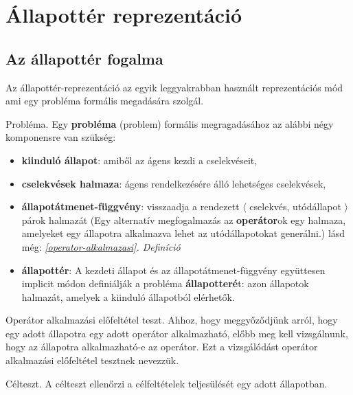 \section{Állapottér reprezentáció}

\subsection{Az állapottér fogalma}

Az állapottér-reprezentáció az egyik leggyakrabban használt reprezentációs mód
ami egy probléma formális megadására szolgál.

\begin{definicio}
    Probléma.
    Egy \textbf{probléma} (problem) formális megragadásához az alábbi négy
    komponensre van szükség:

    \begin{itemize}
        \item \textbf{kiinduló állapot}:
            amiből az ágens kezdi a cselekvéseit,
        \item \textbf{cselekvések halmaza}:
            ágens rendelkezésére álló lehetséges cselekvések,
        \item \textbf{állapotátmenet-függvény}:
            visszaadja a rendezett $\langle$ cselekvés, utódállapot $\rangle$
            párok halmazát (Egy alternatív megfogalmazás az \textbf{operátor}ok
            egy halmaza, amelyeket egy állapotra alkalmazva lehet az
            utódállapotokat generálni.) lásd még:
            \textit{\ref{operator-alkalmazasi}. Definíció}
        \item \textbf{állapottér}: A kezdeti állapot és az
            állapotátmenet-függvény együttesen implicit módon definiálják a
            probléma \textbf{állapotteré}t: azon állapotok halmazát, amelyek a
            kiinduló állapotból elérhetők.
    \end{itemize}
\end{definicio}

\begin{definicio}\label{operator-alkalmazasi}
    Operátor alkalmazási előfeltétel teszt.
    Ahhoz, hogy meggyőződjünk arról, hogy egy adott állapotra egy adott
    operátor alkalmazható, előbb meg kell vizsgálnunk, hogy az állapotra
    alkalmazható-e az operátor. Ezt a vizsgálódást operátor alkalmazási
    előfeltétel tesztnek nevezzük.
\end{definicio}

\begin{definicio}
    Célteszt.
    A célteszt ellenőrzi a célfeltételek teljesülését egy adott állapotban.
\end{definicio}

